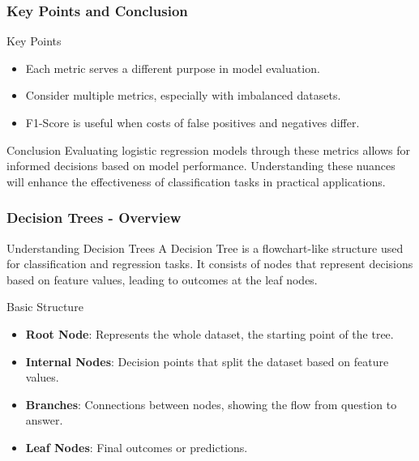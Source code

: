 \documentclass[aspectratio=169]{beamer}
\begin{document}
\begin{frame}[fragile]
    \frametitle{Key Points and Conclusion}
    \begin{block}{Key Points}
        \begin{itemize}
            \item Each metric serves a different purpose in model evaluation.
            \item Consider multiple metrics, especially with imbalanced datasets.
            \item F1-Score is useful when costs of false positives and negatives differ.
        \end{itemize}
    \end{block}
    
    \begin{block}{Conclusion}
        Evaluating logistic regression models through these metrics allows for informed decisions based on model performance. Understanding these nuances will enhance the effectiveness of classification tasks in practical applications.
    \end{block}
\end{frame}

\begin{frame}[fragile]
    \frametitle{Decision Trees - Overview}
    \begin{block}{Understanding Decision Trees}
        A Decision Tree is a flowchart-like structure used for classification and regression tasks. It consists of nodes that represent decisions based on feature values, leading to outcomes at the leaf nodes.
    \end{block}
    
    \begin{block}{Basic Structure}
        \begin{itemize}
            \item \textbf{Root Node}: Represents the whole dataset, the starting point of the tree.
            \item \textbf{Internal Nodes}: Decision points that split the dataset based on feature values.
            \item \textbf{Branches}: Connections between nodes, showing the flow from question to answer.
            \item \textbf{Leaf Nodes}: Final outcomes or predictions.
        \end{itemize}
    \end{block}
\end{frame}
\end{document}

